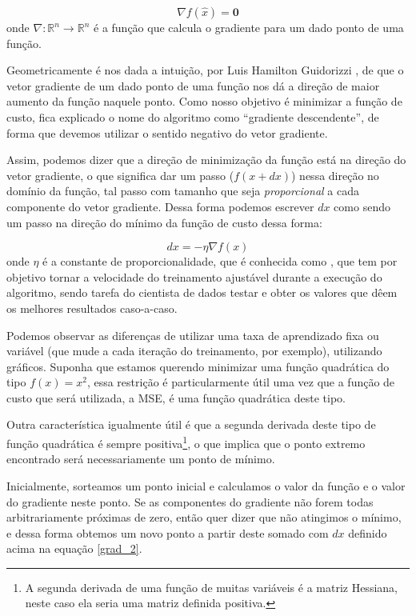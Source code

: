 \begin{equation}\label{grad_1}
\nabla f(\hat{x}) = \mathbf{0}
\end{equation}
onde $\nabla{:}\mathbb{R}^n \rightarrow \mathbb{R}^n$ é a função que calcula o gradiente para um dado ponto de uma função.

Geometricamente é nos dada a intuição, por Luis Hamilton Guidorizzi \citep{guidorizzi2}, de que o vetor gradiente de um dado ponto de uma função nos dá a direção de maior aumento da função naquele ponto. Como nosso objetivo é minimizar a função de custo, fica explicado o nome do algoritmo como ``gradiente descendente'', de forma que devemos utilizar o sentido negativo do vetor gradiente.

Assim, podemos dizer que a direção de minimização da função está na direção do vetor gradiente, o que significa dar um passo ($f(x + dx)$) nessa direção no domínio da função, tal passo com tamanho que seja \emph{proporcional} a cada componente do vetor gradiente. Dessa forma podemos escrever $dx$ como sendo um passo na direção do mínimo da função de custo dessa forma:

\begin{equation}\label{grad_2}
dx = - \eta \nabla f(x)
\end{equation}
onde $\eta$ é a constante de proporcionalidade, que é conhecida como , que tem por objetivo tornar a velocidade do treinamento ajustável durante a execução do algoritmo, sendo tarefa do cientista de dados testar e obter os valores que dêem os melhores resultados caso-a-caso. 

Podemos observar as diferenças de utilizar uma taxa de aprendizado fixa ou variável (que mude a cada iteração do treinamento, por exemplo), utilizando gráficos. Suponha que estamos querendo minimizar uma função quadrática do tipo $f(x) = x^2$, essa restrição é particularmente útil uma vez que a função de custo que será utilizada, a MSE, é uma função quadrática deste tipo. 

Outra característica igualmente útil é que a segunda derivada deste tipo de função quadrática é sempre positiva\footnote{A segunda derivada de uma função de muitas variáveis é a matriz Hessiana, neste caso ela seria uma matriz definida positiva.}, o que implica que o ponto extremo encontrado será necessariamente um ponto de mínimo.

Inicialmente, sorteamos um ponto inicial e calculamos o valor da função e o valor do gradiente neste ponto. Se as componentes do gradiente não forem todas arbitrariamente próximas de zero, então quer dizer que não atingimos o mínimo, e dessa forma obtemos um novo ponto a partir deste somado com $dx$ definido acima na equação \ref{grad_2}. 

